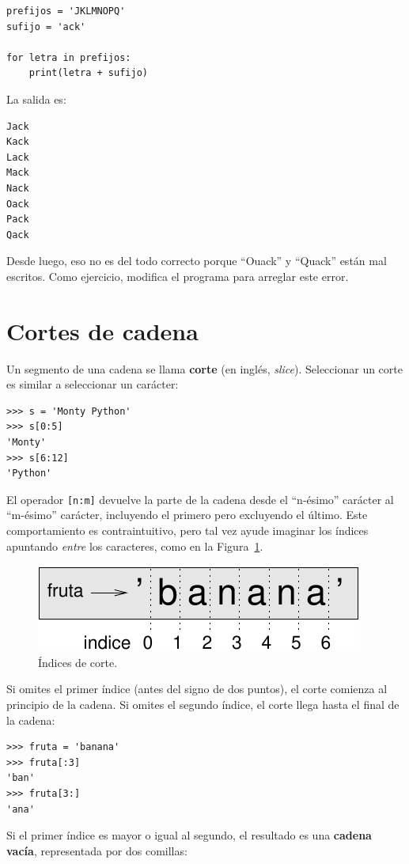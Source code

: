 \documentclass[10pt]{book}
\begin{document}
\begin{verbatim}
prefijos = 'JKLMNOPQ'
sufijo = 'ack'

for letra in prefijos:
    print(letra + sufijo)
\end{verbatim}
%
La salida es:

\begin{verbatim}
Jack
Kack
Lack
Mack
Nack
Oack
Pack
Qack
\end{verbatim}
%
Desde luego, eso no es del todo correcto porque ``Ouack'' y ``Quack'' están
mal escritos.  Como ejercicio, modifica el programa para arreglar este error.



\section{Cortes de cadena}
\label{slice}
  
  

Un segmento de una cadena se llama {\bf corte} (en inglés, {\em slice}).  Seleccionar un corte es
similar a seleccionar un carácter:

\begin{verbatim}
>>> s = 'Monty Python'
>>> s[0:5]
'Monty'
>>> s[6:12]
'Python'
\end{verbatim}
%
El operador {\tt [n:m]} devuelve la parte de la cadena desde el 
``n-ésimo'' carácter al ``m-ésimo'' carácter, incluyendo el primero pero
excluyendo el último.  Este comportamiento es contraintuitivo, pero tal vez
ayude imaginar los índices apuntando {\em entre} los
caracteres, como en la Figura~\ref{fig.banana}.

\begin{figure}
\centerline
{\includegraphics[scale=0.8]{figs/banana.pdf}}
\caption{Índices de corte.}
\label{fig.banana}
\end{figure}

Si omites el primer índice (antes del signo de dos puntos), el corte comienza al
principio de la cadena.  Si omites el segundo índice, el corte
llega hasta el final de la cadena:

\begin{verbatim}
>>> fruta = 'banana'
>>> fruta[:3]
'ban'
>>> fruta[3:]
'ana'
\end{verbatim}
%
Si el primer índice es mayor o igual al segundo, el resultado
es una {\bf cadena vacía}, representada por dos comillas:
\end{document}
